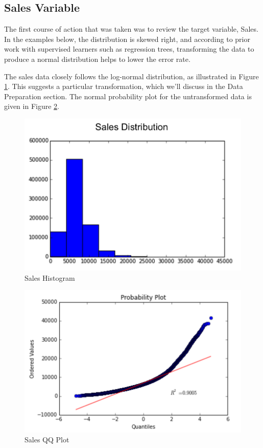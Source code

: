 \documentclass[DIV=calc, paper=a4, fontsize=11pt]{scrartcl}	 %
\begin{document}
\subsection*{Sales Variable}

The first course of action that was taken was to review the target variable, Sales. In the examples below, the distribution is skewed right, and according to prior work with supervised learners such as regression trees, transforming the data to produce a normal distribution helps to lower the error rate\cite{Jank}. 

The sales data closely follows the log-normal distribution, as illustrated in Figure \ref{lognormalhist}. This suggests a particular transformation, which we'll discuss in the Data Preparation section. The normal probability plot for the untransformed data is given in Figure \ref{lognormalqq}.

\begin{figure}[!htbp]
\centering
\caption{Sales Histogram}
\label{lognormalhist}
\includegraphics[scale=0.75]{figures/saleslognormalhist.png}
\end{figure} 

\begin{figure}[!htbp]
\centering
\caption{Sales QQ Plot}
\label{lognormalqq}
\includegraphics[scale=0.75]{figures/saleslognormalQQ.png}
\end{figure} 
\end{document}
